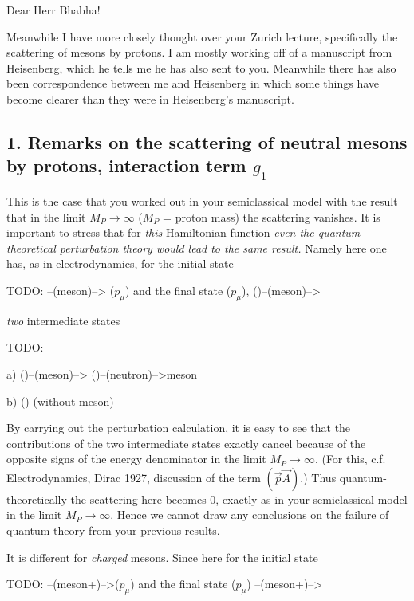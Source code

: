 \date{May 4, 1939}


Dear Herr Bhabha!

Meanwhile I have more closely thought over your Zurich lecture, specifically the scattering of mesons by protons. I am mostly working off of a manuscript from Heisenberg, which he tells me he has also sent to you. Meanwhile there has also been correspondence between me and Heisenberg in which some things have become clearer than they were in Heisenberg's manuscript.

\subsection*{1. Remarks on the scattering of neutral mesons by protons, interaction term $g_1$}

This is the case that you worked out in your semiclassical model with the result that in the limit $M_P \to \infty$ ($M_P$ = proton mass) the scattering vanishes. It is important to stress that for \textit{this} Hamiltonian function \textit{even the quantum theoretical perturbation theory would lead to the same result.} Namely here one has, as in electrodynamics, for the initial state

TODO: --(meson)--> ($p_\mu$) and the final state ($p_\mu$), ()--(meson)-->

\textit{two} intermediate states

TODO:

a) ()--(meson)--> ()--(neutron)-->meson

b) () (without meson)

By carrying out the perturbation calculation, it is easy to see that the contributions of the two intermediate states exactly cancel because of the opposite signs of the energy denominator in the limit $M_P \to \infty$. (For this, c.f. Electrodynamics, Dirac 1927, discussion of the term $(\vec{p}\vec{A})$.) Thus quantum-theoretically the scattering here becomes 0, exactly as in your semiclassical model in the limit $M_P \to \infty$. Hence we cannot draw any conclusions on the failure of quantum theory from your previous results.

It is different for \textit{charged} mesons. Since here for the initial state

TODO: --(meson+)-->($p_\mu$) and the final state ($p_\mu$) --(meson+)-->


